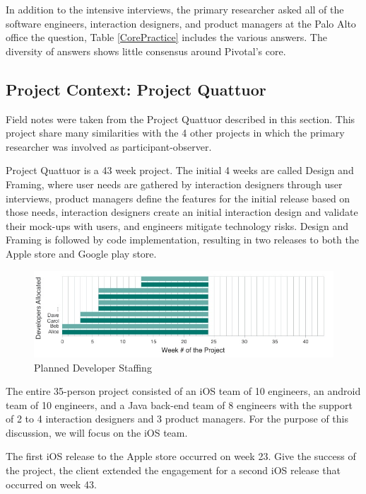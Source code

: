 In addition to the intensive interviews, the primary researcher asked all of the software engineers, interaction designers, and product managers at the Palo Alto office the question,  Table \ref{CorePractice} includes the various answers. The diversity of answers shows little consensus around Pivotal's core. 

\subsection{Project Context: Project Quattuor}
Field notes were taken from the Project Quattuor described in this section. This project share many similarities with the 4 other projects in which the primary researcher was involved as participant-observer.

\label{ExampleInAction}
Project Quattuor is a 43 week project. The initial 4 weeks are called Design and Framing, where user needs are gathered by interaction designers through user interviews, product managers define the features for the initial release based on those needs, interaction designers create an initial interaction design and validate their mock-ups with users, and engineers mitigate technology risks. Design and Framing is followed by code implementation, resulting in two releases to both the Apple store and Google play store.

\begin{figure}[t]
\centering
\includegraphics[width=7.1in]{OriginalDeveloperStaffingV2.jpg}
\caption{Planned Developer Staffing}
\label{PlannedDeveloperStaffing}
\end{figure}

The entire 35-person project consisted of an iOS team of 10 engineers, an android team of 10 engineers, and a Java back-end team of 8 engineers with the support of 2 to 4 interaction designers and 3 product managers. For the purpose of this discussion, we will focus on the iOS team. 

The first iOS release to the Apple store occurred on week 23. Give the success of the project, the client extended the engagement for a second iOS release that occurred on week 43. 

